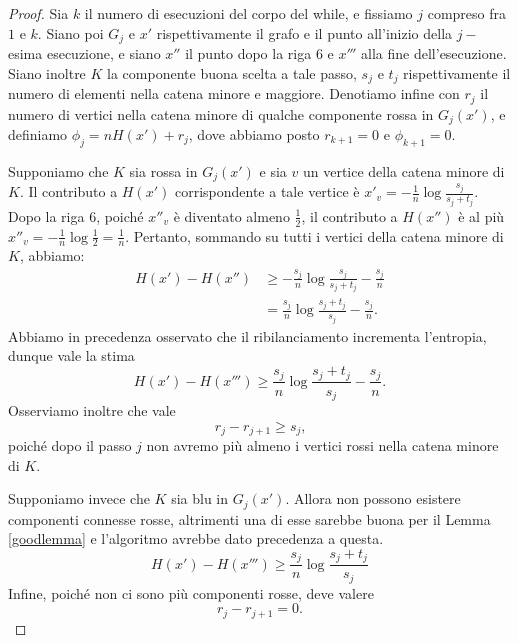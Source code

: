 \begin{proof}
	Sia \(k\) il numero di esecuzioni del corpo del while, e fissiamo \(j\) compreso fra \(1\) e \(k\). Siano poi \(G_j\) e \(x'\) rispettivamente il grafo e il punto all'inizio della \(j-\)esima esecuzione, e siano \(x''\) il punto dopo la riga \(6\) e \(x'''\) alla fine dell'esecuzione. Siano inoltre \(K\) la componente buona scelta a tale passo, \(s_j\) e \(t_j\) rispettivamente il numero di elementi nella catena minore e maggiore. Denotiamo infine con \(r_j\) il numero di vertici nella catena minore di qualche componente rossa in \(G_j(x')\), e definiamo \(\phi_j=nH(x')+r_j\), dove abbiamo posto \(r_{k+1}=0\) e \(\phi_{k+1}=0\).
	
	Supponiamo che \(K\) sia rossa in \(G_j(x')\) e sia \(v\) un vertice della catena minore di \(K\). Il contributo a \(H(x')\) corrispondente a tale vertice \`e \(x'_v = -\frac{1}{n}\log{\frac{s_j}{s_j+t_j}}\). Dopo la riga \(6\), poich\'e \(x''_v\) \`e diventato almeno \(\frac{1}{2}\), il contributo a \(H(x'')\) \`e al pi\`u \(x''_v = -\frac{1}{n}\log{\frac{1}{2}} = \frac{1}{n}\). Pertanto, sommando su tutti i vertici della catena minore di \(K\), abbiamo:
	\begin{align}
	  H(x')-H(x'') &\ge -\frac{s_j}{n}\log{\frac{s_j}{s_j+t_j}} - \frac{s_j}{n} \nonumber \\
	               &=   \frac{s_j}{n}\log{\frac{s_j+t_j}{s_j}} - \frac{s_j}{n}\text{.} \nonumber
	\end{align}
	Abbiamo in precedenza osservato che il ribilanciamento incrementa l'entropia, dunque vale la stima
	\begin{equation} \label{eq:redentropy}
	  H(x')-H(x''') \ge \frac{s_j}{n}\log{\frac{s_j+t_j}{s_j}} - \frac{s_j}{n}\text{.}
	\end{equation}
	Osserviamo inoltre che vale
	\begin{equation} \label{eq:redvertices}
	  r_j-r_{j+1} \ge s_j\text{,} 
	\end{equation}
	poich\'e dopo il passo \(j\) non avremo pi\`u almeno i vertici rossi nella catena minore di \(K\).
	
	Supponiamo invece che \(K\) sia blu in \(G_j(x')\). Allora non possono esistere componenti connesse rosse, altrimenti una di esse sarebbe buona per il Lemma \ref{goodlemma} e l'algoritmo avrebbe dato precedenza a questa.
	\begin{equation} \label{eq:blueentropy}
	  H(x')-H(x''') \ge \frac{s_j}{n}\log{\frac{s_j+t_j}{s_j}}
	\end{equation}
	Infine, poich\'e non ci sono pi\`u componenti rosse, deve valere
	\begin{equation} \label{eq:bluevertices}
	  r_j - r_{j+1} = 0\text{.}
	\end{equation}
	

\end{proof}
